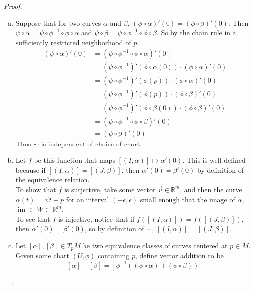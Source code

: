 \documentclass{article}
\begin{document}
\begin{proof} \text{} \\
  \begin{enumerate}[(a)]
    \item
      Suppose that for two curves $\alpha$ and $\beta$,
      $(\phi \circ \alpha)'(0) = (\phi \circ \beta)'(0)$. Then
      $\psi \circ \alpha = \psi \circ \phi^{-1} \circ \phi \circ \alpha$ and
      $\psi \circ \beta = \psi \circ \phi^{-1} \circ \phi \circ \beta$.
      So by the chain rule in a sufficiently restricted neighborhood of $p$,
      \begin{align*}
        (\psi \circ \alpha)'(0)
        &= (\psi \circ \phi^{-1} \circ \phi \circ \alpha)'(0) \\
        &= (\psi \circ \phi^{-1})'(\phi \circ \alpha(0)) \cdot (\phi \circ \alpha)'(0) \\
        &= (\psi \circ \phi^{-1})'(\phi(p)) \cdot (\phi \circ \alpha)'(0) \\
        &= (\psi \circ \phi^{-1})'(\phi(p)) \cdot (\phi \circ \beta)'(0) \\
        &= (\psi \circ \phi^{-1})'(\phi \circ \beta(0)) \cdot (\phi \circ \beta)'(0) \\
        &= (\psi \circ \phi^{-1} \circ \phi \circ \beta)'(0) \\
        &= (\psi \circ \beta)'(0)
      \end{align*} Thus $\sim$ is independent of choice of chart.
    \item
      Let $f$ be this function that maps $[(I, \alpha)] \mapsto \alpha'(0)$.
      This is well-defined because if $[(I, \alpha)] = [(J, \beta)]$, then
      $\alpha'(0) = \beta'(0)$ by definition of the equivalence relation.\\
      To show that $f$ is surjective, take some vector
      $\vec{v} \in \mathbb{R}^m$, and then the curve $\alpha(t) = \vec{v}t + p$
      for an interval $(-\epsilon, \epsilon)$ small enough that the image of
      $\alpha$, $\operatorname{im} \subset W \subset \mathbb{R}^m$.\\
      To see that $f$ is injective, notice that if
      $f([(I, \alpha)]) = f([(J, \beta)])$, then $\alpha'(0) = \beta'(0)$, so
      by definition of $\sim$, $[(I, \alpha)] = [(J, \beta)]$.
    \item
      Let $[\alpha], [\beta] \in T_pM$ be two equivalence classes of curves
      centered at $p \in M$. Given some chart $(U, \phi)$ containing $p$, define
      vector addition to be \[
        [\alpha] + [\beta] = [\phi^{-1}((\phi \circ \alpha) + (\phi \circ \beta))]
\]
\end{enumerate}
\end{proof}
\end{document}
